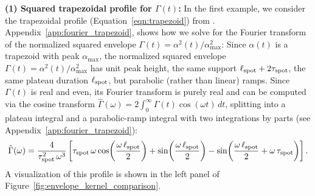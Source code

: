 \documentclass[preprint]{aastex702}
\newcommand{\FT}[1]{\hat{#1}}
\begin{document}
\textbf{(1) Squared trapezoidal profile for $\Gamma(t)$:} In the first example, we consider the trapezoidal profile (Equation~\ref{eqn:trapezoid}) from \citet{kipping_analytic_2012}. Appendix~\ref{app:fourier_trapezoid}, shows how we solve for the Fourier transform of the normalized squared envelope $\Gamma(t) = \alpha^2(t)/\alpha_{\max}^2$: Since $\alpha(t)$ is a trapezoid with peak $\alpha_{\max}$, the normalized squared envelope $\Gamma(t) = \alpha^2(t)/\alpha_{\max}^2$ has unit peak height, the same support $\ell_{\rm spot} + 2\tau_{\rm spot}$, the same plateau duration $\ell_{\rm spot}$, but parabolic (rather than linear) ramps. Since $\Gamma(t)$ is real and even, its Fourier transform is purely real and can be computed via the cosine transform $\FT{\Gamma}(\omega) = 2\int_0^\infty \Gamma(t)\cos(\omega t)\,dt$, splitting into a plateau integral and a parabolic-ramp integral with two integrations by parts (see Appendix~\ref{app:fourier_trapezoid}):
\begin{equation}
    \FT{\Gamma}(\omega) = \frac{4}{\tau_{\rm spot}^2\,\omega^3}
    \left[
        \tau_{\rm spot}\,\omega\cos\!\left(\frac{\omega\,\ell_{\rm spot}}{2}\right)
        + \sin\!\left(\frac{\omega\,\ell_{\rm spot}}{2}\right)
        - \sin\!\left(\frac{\omega\,\ell_{\rm spot}}{2} + \omega\,\tau_{\rm spot}\right)
    \right].
    \label{eq:Gamma_hat}
\end{equation}
A visualization of this profile is shown in the left panel of Figure~\ref{fig:envelope_kernel_comparison}.
\end{document}
